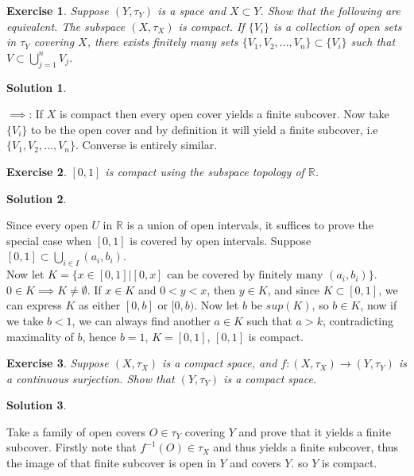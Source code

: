 \documentclass[11pt,a4paper]{article}
\newtheorem{Ex}{Exercise}
\newtheorem{Sol}{Solution}
\begin{document}
\begin{Ex}
	Suppose $(Y, \tau_Y)$ is a space and $X \subset Y$. Show that the following are equivalent. The subspace $(X, \tau_X)$ is compact. If $\{V_i\}$ is a collection of open sets in $\tau_Y$ covering  $X$, there exists finitely many sets $\{V_1, V_2, \dots ,V_n\} \subset \{V_i\}$ such that $V \subset \bigcup_{j=1}^n V_j$.

\end{Ex}

\begin{Sol} \end{Sol}
\noindent $\implies$: If $X$ is compact then every open cover yields a finite subcover. Now take $\{V_i\}$ to be the open cover and by definition it will yield a finite subcover, i.e $\{V_1, V_2, \dots ,V_n \}$. Converse is entirely similar. 

\begin{Ex}
	$[0,1]$ is compact using the subspace topology of $\mathbb{R}$.
\end{Ex}

\begin{Sol}\end{Sol}

\noindent Since every open $U$ in $\mathbb{R}$ is a union of open intervals, it suffices to prove the special case when $[0,1]$ is covered by open intervals. Suppose $[0,1] \subset \bigcup_{i \in I}(a_i,b_i)$. \\ Now let $K = \{x \in [0,1]| [0,x] \text{ can be covered by finitely many }(a_i, b_i) \}$. $0 \in K \implies K \neq \emptyset$. If $x \in K$ and $0 < y < x$, then $y \in K$, and since $K \subset [0,1]$, we can express $K$ as either $[0,b]$ or $[0,b)$. Now let $b$ be $sup(K)$, so $b \in K$, now if we take $b<1$, we can always find another $a \in K$ such that $a > k$, contradicting maximality of $b$, hence $b = 1$, $K = [0,1]$, $[0,1]$ is compact.

\begin{Ex}
	Suppose $(X, \tau_X)$ is a compact space, and $f: (X, \tau_X) \rightarrow (Y,\tau_Y)$ is a continuous surjection. Show that $(Y, \tau_Y)$ is a compact space.  
\end{Ex}

\begin{Sol} \end{Sol}
Take a family  of open covers $O \in \tau_Y$ covering $Y$ and prove that it yields a finite subcover. Firstly note that $f^{-1}(O) \in \tau_X$ and thus yields a finite subcover, thus the image of that finite subcover is open in $Y$ and covers $Y$. so $Y$ is compact.
\end{document}
